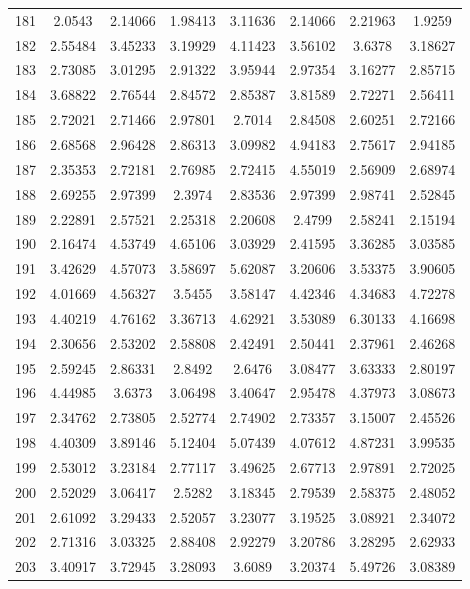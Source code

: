 \begin{figure}
\begin{tabular}{cccccccc}
181 & 2.0543 & 2.14066 & 1.98413 & 3.11636 & 2.14066 & 2.21963 & 1.9259\\
182 & 2.55484 & 3.45233 & 3.19929 & 4.11423 & 3.56102 & 3.6378 & 3.18627\\
183 & 2.73085 & 3.01295 & 2.91322 & 3.95944 & 2.97354 & 3.16277 & 2.85715\\
184 & 3.68822 & 2.76544 & 2.84572 & 2.85387 & 3.81589 & 2.72271 & 2.56411\\
185 & 2.72021 & 2.71466 & 2.97801 & 2.7014 & 2.84508 & 2.60251 & 2.72166\\
186 & 2.68568 & 2.96428 & 2.86313 & 3.09982 & 4.94183 & 2.75617 & 2.94185\\
187 & 2.35353 & 2.72181 & 2.76985 & 2.72415 & 4.55019 & 2.56909 & 2.68974\\
188 & 2.69255 & 2.97399 & 2.3974 & 2.83536 & 2.97399 & 2.98741 & 2.52845\\
189 & 2.22891 & 2.57521 & 2.25318 & 2.20608 & 2.4799 & 2.58241 & 2.15194\\
190 & 2.16474 & 4.53749 & 4.65106 & 3.03929 & 2.41595 & 3.36285 & 3.03585\\
191 & 3.42629 & 4.57073 & 3.58697 & 5.62087 & 3.20606 & 3.53375 & 3.90605\\
192 & 4.01669 & 4.56327 & 3.5455 & 3.58147 & 4.42346 & 4.34683 & 4.72278\\
193 & 4.40219 & 4.76162 & 3.36713 & 4.62921 & 3.53089 & 6.30133 & 4.16698\\
194 & 2.30656 & 2.53202 & 2.58808 & 2.42491 & 2.50441 & 2.37961 & 2.46268\\
195 & 2.59245 & 2.86331 & 2.8492 & 2.6476 & 3.08477 & 3.63333 & 2.80197\\
196 & 4.44985 & 3.6373 & 3.06498 & 3.40647 & 2.95478 & 4.37973 & 3.08673\\
197 & 2.34762 & 2.73805 & 2.52774 & 2.74902 & 2.73357 & 3.15007 & 2.45526\\
198 & 4.40309 & 3.89146 & 5.12404 & 5.07439 & 4.07612 & 4.87231 & 3.99535\\
199 & 2.53012 & 3.23184 & 2.77117 & 3.49625 & 2.67713 & 2.97891 & 2.72025\\
200 & 2.52029 & 3.06417 & 2.5282 & 3.18345 & 2.79539 & 2.58375 & 2.48052\\
201 & 2.61092 & 3.29433 & 2.52057 & 3.23077 & 3.19525 & 3.08921 & 2.34072\\
202 & 2.71316 & 3.03325 & 2.88408 & 2.92279 & 3.20786 & 3.28295 & 2.62933\\
203 & 3.40917 & 3.72945 & 3.28093 & 3.6089 & 3.20374 & 5.49726 & 3.08389\\

\end{tabular}
\end{figure}
